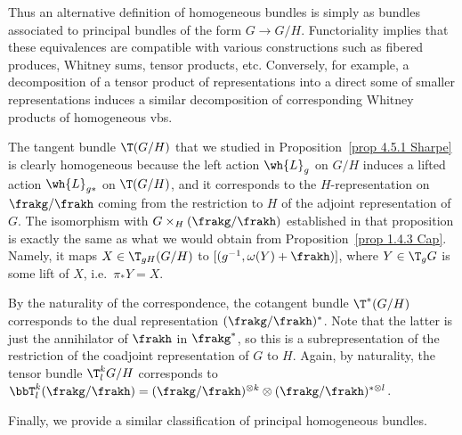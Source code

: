 Thus an alternative definition of homogeneous bundles is simply as bundles associated to principal bundles of the form $G\to G\slash H$. Functoriality implies that these equivalences are compatible with various constructions such as fibered produces, Whitney sums, tensor products, etc. Conversely, for example, a decomposition of a tensor product of representations into a direct some of smaller representations induces a similar decomposition of corresponding Whitney products of homogeneous \glspl{vb}.

\begin{example}\label{ex 1.4.3 Cap}
    The  tangent  bundle $\T(G\slash H)$ that we studied in Proposition~\ref{prop 4.5.1 Sharpe} is clearly homogeneous because the left action $\wh{L}_g$ on $G\slash H$ induces a lifted action $\wh{L}_{g\ast}$ on $\T(G\slash H)$, and it corresponds to the $H$-representation on $\frakg\slash \frakh$ coming from the restriction to $H$ of the adjoint representation of $G$. The isomorphism with $G\times_H (\frakg\slash\frakh)$ established in that proposition is exactly the same as what we would obtain from Proposition~\ref{prop 1.4.3 Cap}. Namely, it maps $X\in \T_{gH}(G\slash H)$ to $[(g^{-1},\omega(Y)+\frakh)]$, where $Y\in \T_g G$ is some lift of $X$, i.e.\ $\pi_\ast Y=X$.

    By the naturality of the correspondence, the cotangent bundle $\T^\ast(G\slash H)$ corresponds to the dual representation $(\frakg\slash\frakh)^\ast$. Note that the latter is just the annihilator of $\frakh$ in $\frakg^\ast$, so this is a subrepresentation of the restriction of the coadjoint representation of $G$ to $H$. Again, by naturality, the tensor bundle $\T^k_l G\slash H$ corresponds to $\bbT^k_l(\frakg\slash\frakh)=(\frakg\slash\frakh)^{\otimes k}\otimes (\frakg\slash\frakh)^{\ast\otimes l}$.
\end{example}


Finally, we provide a similar classification of principal homogeneous bundles.

